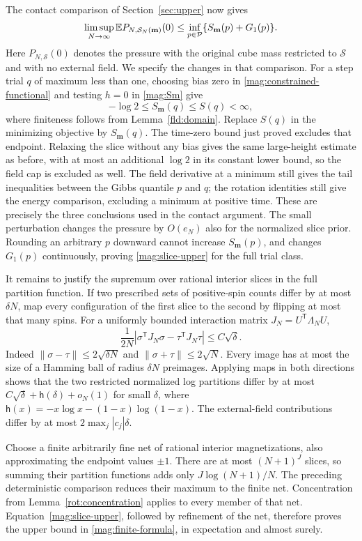 The contact comparison of Section~\ref{sec:upper} now gives
\begin{equation}\label{mag:slice-upper}
 \limsup_{N\to\infty}\mathbb E P_{N,\mathcal S_N(\mathbf m)}(0)
      \le\inf_{p\in\mathcal P}\{S_{\mathbf m}(p)+G_1(p)\}.
\end{equation}
Here $P_{N,\mathcal S}(0)$ denotes the pressure with the original cube
mass restricted to $\mathcal S$ and with no external field. We specify
the changes in that comparison. For a step trial $q$ of maximum less
than one, choosing bias zero in \eqref{mag:constrained-functional} and
testing $h=0$ in \eqref{mag:Sm} give
\[
 -\log2\le S_{\mathbf m}(q)\le S(q)<\infty,
\]
where finiteness follows from Lemma~\ref{fld:domain}. Replace $S(q)$
in the minimizing objective by $S_{\mathbf m}(q)$.
The time-zero bound just proved excludes that endpoint. Relaxing the
slice without any bias gives the same large-height estimate as before,
with at most an additional $\log2$ in its constant lower bound, so the
field cap is excluded as well. The field derivative at a minimum
still gives the tail inequalities between the Gibbs quantile $p$ and
$q$; the rotation identities still give the energy comparison, excluding
a minimum at positive time. These are precisely the three conclusions
used in the contact argument. The small perturbation changes the pressure
by $O(e_N)$ also for the normalized slice prior. Rounding an arbitrary
$p$ downward cannot increase $S_{\mathbf m}(p)$, and changes $G_1(p)$
continuously, proving \eqref{mag:slice-upper} for the full trial class.

It remains to justify the supremum over rational interior slices in the
full partition function. If two prescribed sets of positive-spin counts
differ by at most $\delta N$, map every configuration of the first slice
to the second by flipping at most that many spins. For a uniformly bounded
interaction matrix $J_N=U^{\mathsf T}\Lambda_NU$,
\[
 \frac1{2N}\left|\sigma^{\mathsf T}J_N\sigma
                       -\tau^{\mathsf T}J_N\tau\right|
 \le C\sqrt\delta.
\]
Indeed $\|\sigma-\tau\|\le2\sqrt{\delta N}$ and
$\|\sigma+\tau\|\le2\sqrt N$. Every image has at most the size of
a Hamming ball of radius $\delta N$ preimages. Applying maps in both
directions shows that the two restricted normalized log partitions differ
by at most $C\sqrt\delta+\mathsf h(\delta)+o_N(1)$ for small $\delta$,
where $\mathsf h(x)=-x\log x-(1-x)\log(1-x)$.
The external-field contributions differ by at most
$2\max_j|c_j|\delta$.

Choose a finite arbitrarily fine net of rational interior magnetizations,
also approximating the endpoint values $\pm1$. There are at most
$(N+1)^J$ slices, so summing their partition functions adds only
$J\log(N+1)/N$. The preceding deterministic comparison reduces their
maximum to the finite net. Concentration from
Lemma~\ref{rot:concentration} applies to every member of that net.
Equation~\eqref{mag:slice-upper}, followed by refinement of the net,
therefore proves the upper bound in \eqref{mag:finite-formula}, in
expectation and almost surely.

